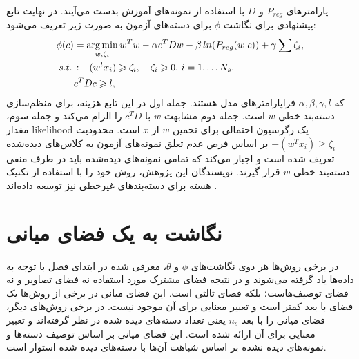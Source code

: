 پارامترهای $P_{reg}$ و $D$ با استفاده از نمونه‌های آموزش بدست می‌آیند.
در نهایت تابع پیشنهادی برای نگاشت $\phi$ برای دسته‌های آزمون به صورت زیر تعریف می‌شود:
\begin{align}
\label{eq:write_a}
\phi(c) &= \operatorname*{arg\,min}_{w,\zeta_i} w^Tw - \alpha c^TDw -\beta \, ln(P_{reg}(w|c)) + \gamma \sum \zeta_i, \\
s.t. \, &: -(w^tx_i) \geqslant \zeta_i, \quad \zeta_i \geqslant 0, \, i=1,\ldots N_s,  \nonumber \\
& c^TDc \geqslant l, \nonumber
\end{align}
که $\alpha, \beta, \gamma, l$ فراپارامترهای مدل هستند. جمله اول در این تابع هزینه، برای منظم‌سازی دسته‌بند خطی $w$ است. جمله دوم مشابهت $w$ با $c^TD$ را الزام می‌کند و
 جمله سوم، مقدار \gls{likelihood} یک رگرسیون احتمالی برای تخمین $w$ از $x$ است.
  محدودیت $-(w^Tx_i) \geq \zeta_i$ بر اساس فرض عدم تعلق
نمونه‌های آزمون به کلاس‌های دیده‌شده تعریف شده است و اجبار می‌کند که تمامی نمونه‌های دیده‌شده باید در طرف منفی دسته‌بند خطی $w$ قرار گیرند.
نویسندگان این پژوهش، روش خود را با استفاده از تکنیک هسته
برای دسته‌بندهای غیرخطی نیز توسعه داده‌اند \cite{elhoseiny2015}.

\section{نگاشت به یک فضای میانی}
در برخی روش‌ها هر دوی نگاشت‌های $\phi$ و $\theta$، معرفی شده در ابتدای فصل با توجه به داده‌ها یاد گرفته می‌شوند و در نتیجه فضای مشترک مورد استفاده نه فضای تصاویر و نه فضای توصیف‌هاست؛ بلکه فضای ثالثی است. این فضای میانی در برخی از روش‌ها یک فضای با بعد کمتر است و تعبیر معنایی برای آن موجود نیست. در برخی روش‌های دیگر، فضای میانی را با بعد $n_s$ یعنی تعداد دسته‌های دیده شده در نظر گرفته‌اند و تعبیر معنایی برای آن ارائه شده است. این فضای میانی بر اساس توصیف دسته‌ها و نمونه‌های دیده نشده بر اساس شباهت آن‌ها با دسته‌های دیده شده استوار است.

